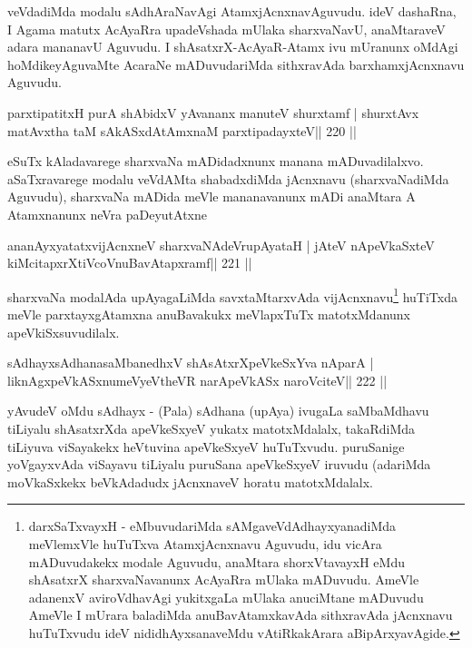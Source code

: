 \begin{artha}
veVdadiMda modalu sAdhAraNavAgi AtamxjAcnxnavAguvudu. ideV dashaRna, I Agama matutx AcAyaRra upadeVshada mUlaka sharxvaNavU, anaMtaraveV adara mananavU Aguvudu. I shAsatxrX-AcAyaR-Atamx ivu mUranunx oMdAgi hoMdikeyAguvaMte AcaraNe mADuvudariMda sithxravAda barxhamxjAcnxnavu Aguvudu.
\end{artha}

\begin{shl}
parxtipatitxH purA shAbidxV yAvananx manuteV shurxtamf |
shurxtAvx matAvx\s tha taM sAkASxdAtAmxnaM parxtipadayxteV\hfill || 220 ||
\end{shl}

\begin{artha}
eSuTx kAladavarege sharxvaNa mADidadxnunx manana mADuvadilalxvo. aSaTxravarege modalu veVdAMta shabadxdiMda jAcnxnavu (sharxvaNadiMda Aguvudu), sharxvaNa mADida meVle mananavanunx mADi anaMtara A Atamxnanunx neVra paDeyutAtxne 
\end{artha}

\begin{shl}
ananAyxyatatxvijAcnxneV sharxvaNAdeVrupAyataH |
jAteV nApeVkaSxteV kiMcitapxrXtiVcoV\s nuBavAtapxramf\hfill || 221 ||
\end{shl}

\begin{artha}
sharxvaNa modalAda upAyagaLiMda savxtaMtarxvAda vijAcnxnavu\footnote[1]{darxSaTxvayxH - eMbuvudariMda sAMgaveVdAdhayxyanadiMda meVlemxVle huTuTxva AtamxjAcnxnavu Aguvudu, idu vicAra mADuvudakekx modale Aguvudu, anaMtara shorxVtavayxH eMdu shAsatxrX sharxvaNavanunx AcAyaRra mUlaka mADuvudu. AmeVle adanenxV aviroVdhavAgi yukitxgaLa mUlaka anuciMtane mADuvudu AmeVle I mUrara baladiMda anuBavAtamxkavAda sithxravAda jAcnxnavu huTuTxvudu ideV nididhAyxsanaveMdu vAtiRkakArara aBipArxyavAgide.} huTiTxda meVle parxtayxgAtamxna anuBavakukx meVlapxTuTx matotxMdanunx apeVkiSxsuvudilalx.
\end{artha}

\begin{shl}
sAdhayxsAdhanasaMbanedhxV shAsAtxrXpeVkeSxYva nAparA |
liknAgxpeVkASx\s numeVyeV\s theVR narApeVkASx naroVciteV\hfill || 222 ||
\end{shl}

\begin{artha}
yAvudeV oMdu sAdhayx - (Pala) sAdhana (upAya) ivugaLa saMbaMdhavu tiLiyalu shAsatxrXda apeVkeSxyeV yukatx matotxMdalalx, takaRdiMda tiLiyuva viSayakekx heVtuvina apeVkeSxyeV huTuTxvudu. puruSanige yoVgayxvAda viSayavu tiLiyalu puruSana apeVkeSxyeV iruvudu (adariMda moVkaSxkekx beVkAdadudx jAcnxnaveV horatu matotxMdalalx.
\end{artha}


